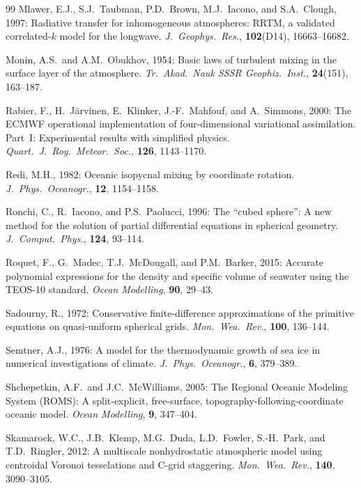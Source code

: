 \documentclass[11pt,twoside]{report}
\begin{document}
\begin{thebibliography}{99}
Mlawer, E.J., S.J.~Taubman, P.D.~Brown, M.J.~Iacono, and S.A.~Clough, 1997:
Radiative transfer for inhomogeneous atmospheres: RRTM, a validated
correlated-$k$ model for the longwave.
\textit{J.\ Geophys.\ Res.}, \textbf{102}(D14), 16663--16682.

Monin, A.S.\ and A.M.~Obukhov, 1954:
Basic laws of turbulent mixing in the surface layer of the atmosphere.
\textit{Tr.\ Akad.\ Nauk SSSR Geophiz.\ Inst.}, \textbf{24}(151), 163--187.

Rabier, F., H.~J\"arvinen, E.~Klinker, J.-F.~Mahfouf, and A.~Simmons, 2000:
The ECMWF operational implementation of four-dimensional variational
assimilation. Part~I: Experimental results with simplified physics.
\textit{Quart.\ J.\ Roy.\ Meteor.\ Soc.}, \textbf{126}, 1143--1170.

Redi, M.H., 1982:
Oceanic isopycnal mixing by coordinate rotation.
\textit{J.\ Phys.\ Oceanogr.}, \textbf{12}, 1154--1158.

Ronchi, C., R.~Iacono, and P.S.~Paolucci, 1996:
The ``cubed sphere'': A new method for the solution of partial differential
equations in spherical geometry.
\textit{J.\ Comput.\ Phys.}, \textbf{124}, 93--114.

Roquet, F., G.~Madec, T.J.~McDougall, and P.M.~Barker, 2015:
Accurate polynomial expressions for the density and specific volume of
seawater using the TEOS-10 standard.
\textit{Ocean Modelling}, \textbf{90}, 29--43.

Sadourny, R., 1972:
Conservative finite-difference approximations of the primitive equations on
quasi-uniform spherical grids.
\textit{Mon.\ Wea.\ Rev.}, \textbf{100}, 136--144.

Semtner, A.J., 1976:
A model for the thermodynamic growth of sea ice in numerical investigations
of climate.
\textit{J.\ Phys.\ Oceanogr.}, \textbf{6}, 379--389.

Shchepetkin, A.F.\ and J.C.~McWilliams, 2005:
The Regional Oceanic Modeling System (ROMS): A split-explicit, free-surface,
topography-following-coordinate oceanic model.
\textit{Ocean Modelling}, \textbf{9}, 347--404.

Skamarock, W.C., J.B.~Klemp, M.G.~Duda, L.D.~Fowler, S.-H.~Park, and
T.D.~Ringler, 2012:
A multiscale nonhydrostatic atmospheric model using centroidal Voronoi
tesselations and C-grid staggering.
\textit{Mon.\ Wea.\ Rev.}, \textbf{140}, 3090--3105.


\end{thebibliography}
\end{document}
